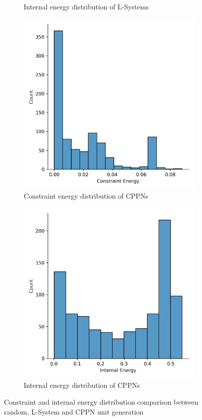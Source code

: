 \begin{figure}[H]
\begin{subfigure}[c]{0.45\textwidth}
		\caption{Internal energy distribution of L-Systems}
	\end{subfigure}
	\hfill
	\begin{subfigure}[c]{0.45\textwidth}
		\centering
		\includegraphics[width=\textwidth]{ce_cppn.png}
		\caption{Constraint energy distribution of CPPNs}
	\end{subfigure}
	\hfill
	\begin{subfigure}[c]{0.45\textwidth}
		\centering
		\includegraphics[width=\textwidth]{ie_cppn.png}
		\caption{Internal energy distribution of CPPNs}
	\end{subfigure}
	\caption[Constraint and internal energy distribution comparison]{Constraint and internal energy distribution comparison between random, L-System and CPPN unit generation}
	\label{fig:ciecomp}
\end{figure}

